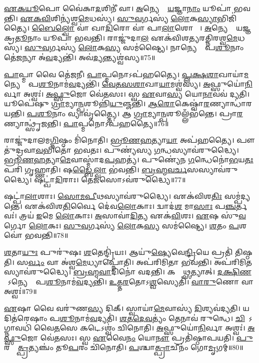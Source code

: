 \ul{𑌏}\ul{𑌕}\ul{𑌯𑍂}𑌪𑍋 𑌵𑍈॑𑌕𑌾\ul{𑌦}𑌶𑌿𑌨𑍀॑ 𑌵𑌾।
\ul{𑌅}𑌨𑍍𑌯𑍇𑌷𑌾𑌂᳚ \ul{𑌯}𑌜𑍍𑌞𑌾\ul{𑌨𑌾𑌂} 𑌯𑍂𑌪𑌾॑ 𑌭𑌵𑌨𑍍𑌤𑌿।
\ul{𑌏}\ul{𑌕}\ul{𑌵𑌿}\ul{}𑌶𑌿𑌨𑍍𑌯॑𑌶𑍍𑌵\ul{𑌮𑍇}𑌧𑌸𑍍𑌯॑।
\ul{𑌸𑍁}\ul{𑌵}𑌰𑍍𑌗𑌸𑍍𑌯॑ \ul{𑌲𑍋}𑌕\ul{𑌸𑍍𑌯𑌾}𑌭𑌿𑌜𑌿॑𑌤𑍍𑌯𑍈।
\ul{𑌬𑍈}\ul{𑌲𑍍}𑌵𑍋 𑌵𑌾॑ 𑌖𑌾\ul{𑌦𑌿}𑌰𑍋 𑌵𑌾॑ 𑌪𑌾\ul{𑌲𑌾}𑌶𑍋 𑌵𑌾᳚।
\ul{𑌅}𑌨𑍍𑌯𑍇𑌷𑌾𑌂᳚ 𑌯𑌜𑍍𑌞𑌕𑍍𑌰\ul{𑌤𑍂}𑌨𑌾𑌂 𑌯𑍂𑌪𑌾॑ 𑌭𑌵𑌨𑍍𑌤𑌿।
𑌰𑌾𑌜𑍍𑌜𑍁॑𑌦𑌾\ul{𑌲} 𑌏𑌕॑𑌵𑌿𑌶𑌤𑍍𑌯𑌰𑌤𑍍𑌨𑌿𑌰𑌶𑍍𑌵\ul{𑌮𑍇}𑌧𑌸𑍍𑌯॑।
\ul{𑌸𑍁}\ul{𑌵}𑌰𑍍𑌗𑌸𑍍𑌯॑ \ul{𑌲𑍋}𑌕\ul{𑌸𑍍𑌯} 𑌸𑌮॑𑌷𑍍𑌟𑍍𑌯𑍈।
𑌨𑌾𑌨𑍍𑌯𑍇𑌷𑌾𑌂᳚ 𑌪\ul{𑌶𑍂}𑌨𑌾𑌂 𑌤𑍇॑\ul{𑌜}𑌨𑍍𑌯𑌾 𑌅॑\ul{𑌵}𑌦𑍍𑌯𑌨𑍍𑌤𑌿॑।
𑌅𑌵॑\ul{𑌦𑍍𑌯}𑌨𑍍𑌤𑍍𑌯𑌶𑍍𑌵॑𑌸𑍍𑌯॥75॥

\ul{𑌪𑌾}𑌪𑍍𑌮𑌾 𑌵𑍈 𑌤𑍇॑\ul{𑌜}𑌨𑍀।
\ul{𑌪𑌾}𑌪𑍍𑌮𑌨𑍋\-𑌽𑌪॑𑌹𑌤𑍍𑌯𑍈।
\ul{𑌪𑍍𑌲}\ul{𑌕𑍍𑌷}\ul{𑌶𑌾}𑌖𑌾𑌯𑌾॑\ul{𑌮}𑌨𑍍𑌯𑍇𑌷𑌾𑌂᳚ 𑌪\ul{𑌶𑍂}𑌨𑌾𑌮॑\ul{𑌵}𑌦𑍍𑌯𑌨𑍍𑌤𑌿॑।
\ul{𑌵𑍇}\ul{𑌤}\ul{𑌸}\ul{𑌶𑌾}𑌖𑌾\ul{𑌯𑌾}𑌮𑌶𑍍𑌵॑𑌸𑍍𑌯।
\ul{𑌅}𑌫𑍍𑌸𑍁𑌯𑍋॑\ul{𑌨𑌿}𑌰𑍍𑌵𑌾 𑌅𑌶𑍍𑌵𑌃॑।
\ul{𑌅}\ul{𑌫𑍍𑌸𑍁}𑌜𑍋 𑌵𑍇॑\ul{𑌤}𑌸𑌃।
𑌸𑍍𑌵 \ul{𑌏}𑌵𑌾\ul{𑌸𑍍𑌯} 𑌯𑍋\ul{𑌨𑌾}𑌵𑌵॑ 𑌦𑍍𑌯𑌤𑌿।
𑌯𑍂𑌪𑍇॑𑌷𑍁 \ul{𑌗𑍍𑌰𑌾}𑌮𑍍𑌯𑌾\ul{𑌨𑍍𑌪}𑌶𑍂𑌨𑍍𑌨𑌿॑\ul{𑌯𑍁}𑌞𑍍𑌜𑌨𑍍𑌤𑌿॑।
\ul{𑌆}\ul{𑌰𑍋}𑌕𑍇𑌷𑍍𑌵𑌾॑\ul{𑌰}𑌣𑍍𑌯𑌾𑌨𑍍𑌧𑌾॑𑌰𑌯𑌨𑍍𑌤𑌿।
\ul{𑌪}\ul{𑌶𑍂}𑌨𑌾𑌂 𑌵𑍍𑌯𑌾𑌵𑍃॑𑌤𑍍𑌤𑍍𑌯𑍈।
𑌆 \ul{𑌗𑍍𑌰𑌾}𑌮𑍍𑌯𑌾\ul{𑌨𑍍𑌪}𑌶𑍂𑌲𑍍𑌲𑌁𑌭॑𑌨𑍍𑌤𑍇।
𑌪𑍍𑌰𑌾\ul{𑌰}𑌣𑍍𑌯𑌾𑌨𑍍𑌥𑍍𑌸𑍃॑𑌜𑌨𑍍𑌤𑌿।
\ul{𑌪𑌾}𑌪𑍍𑌮𑌨𑍋\-𑌽𑌪॑𑌹𑌤𑍍𑌯𑍈॥76॥\anuvakamend[𑌅𑌶𑍍𑌵॑\ul{𑌸𑍍𑌯} 𑌵𑍍𑌯𑌾𑌵𑍃॑\ul{𑌤𑍍𑌤𑍍𑌯𑍈} 𑌤𑍍𑌰𑍀𑌣𑌿॑ 𑌚]

𑌰𑌾𑌜𑍍𑌜𑍁॑𑌦𑌾𑌲𑌮\ul{𑌗𑍍𑌨𑌿}𑌷𑍍𑌠𑌂 𑌮𑌿॑𑌨𑍋𑌤𑌿।
\ul{𑌭𑍍𑌰𑍂}\ul{𑌣}\ul{𑌹}𑌤𑍍𑌯𑌾\ul{𑌯𑌾} 𑌅𑌪॑𑌹𑌤𑍍𑌯𑍈।
𑌪𑍗𑌤𑍁॑𑌦𑍍𑌰𑌵𑌾\ul{𑌵}𑌭𑌿𑌤𑍋॑ 𑌭𑌵𑌤𑌃।
𑌪𑍁𑌣𑍍𑌯॑𑌸𑍍𑌯 \ul{𑌗}𑌨𑍍𑌧𑌸𑍍𑌯𑌾𑌵॑𑌰𑍁𑌦𑍍𑌧𑍍𑌯𑍈।
\ul{𑌭𑍍𑌰𑍂}\ul{𑌣}\ul{𑌹}𑌤𑍍𑌯𑌾\ul{𑌮𑍇}𑌵𑌾𑌸𑍍𑌮𑌾॑𑌦\ul{𑌪}𑌹𑌤𑍍𑌯॑।
𑌪𑍁𑌣𑍍𑌯𑍇॑𑌨 \ul{𑌗}𑌨𑍍𑌧𑍇𑌨𑍋॑\ul{𑌭}𑌯\ul{𑌤𑌃} 𑌪𑌰𑌿॑ 𑌗𑍃𑌹𑍍𑌣𑌾𑌤𑌿।
𑌷\ul{𑌡𑍍𑌬𑍈}\ul{𑌲𑍍}𑌵𑌾 𑌭॑𑌵𑌨𑍍𑌤𑌿।
\ul{𑌬𑍍𑌰}\ul{𑌹𑍍𑌮}\ul{𑌵}\ul{𑌰𑍍𑌚}𑌸𑌸𑍍𑌯𑌾𑌵॑𑌰𑍁𑌦𑍍𑌧𑍍𑌯𑍈।
𑌷𑌟𑍍𑌖𑌾॑\ul{𑌦𑌿}𑌰𑌾𑌃।
𑌤𑍇\ul{𑌜}𑌸𑍋\-𑌽𑌵॑𑌰𑍁𑌦𑍍𑌧𑍍𑌯𑍈॥77॥

𑌷𑌟𑍍𑌪𑌾॑\ul{𑌲𑌾}𑌶𑌾𑌃।
\ul{𑌸𑍋}\ul{𑌮}\ul{𑌪𑍀}𑌥𑌸𑍍𑌯𑌾𑌵॑𑌰𑍁𑌦𑍍𑌧𑍍𑌯𑍈।
𑌏𑌕॑𑌵𑌿𑌶\ul{𑌤𑌿𑌃} 𑌸𑌮𑍍𑌪॑𑌦𑍍𑌯𑌨𑍍𑌤𑍇।
𑌏𑌕॑𑌵𑌿𑌶\ul{𑌤𑌿}𑌰𑍍𑌵𑍈 𑌦𑍇॑𑌵\ul{𑌲𑍋}𑌕𑌾𑌃।
𑌦𑍍𑌵𑌾𑌦॑\ul{𑌶} 𑌮𑌾\ul{𑌸𑌾𑌃} 𑌪\ul{𑌞𑍍𑌚}𑌰𑍍𑌤𑌵𑌃॑।
𑌤𑍍𑌰𑌯॑ \ul{𑌇}𑌮𑍇 \ul{𑌲𑍋}𑌕𑌾𑌃।
\ul{𑌅}𑌸𑌾𑌵𑌾॑\ul{𑌦𑌿}𑌤𑍍𑌯 𑌏𑌕॑\ul{𑌵𑌿}\ul{}𑌶𑌃।
\ul{𑌏}𑌷 𑌸𑍁॑\ul{𑌵}𑌰𑍍𑌗𑍋 \ul{𑌲𑍋}𑌕𑌃।
\ul{𑌸𑍁}\ul{𑌵}𑌰𑍍𑌗𑌸𑍍𑌯॑ \ul{𑌲𑍋}𑌕\ul{𑌸𑍍𑌯} 𑌸𑌮॑𑌷𑍍𑌟𑍍𑌯𑍈।
\ul{𑌶}𑌤𑌂 \ul{𑌪}𑌶𑌵𑍋॑ 𑌭𑌵𑌨𑍍𑌤𑌿॥78॥

\ul{𑌶}𑌤𑌾\ul{𑌯𑍁𑌃} 𑌪𑍁𑌰𑍁॑𑌷𑌃 \ul{𑌶}𑌤𑍇𑌨𑍍𑌦𑍍𑌰𑌿॑𑌯𑌃।
𑌆𑌯𑍁॑\ul{𑌷𑍍𑌯𑍇}𑌵𑍇\ul{𑌨𑍍𑌦𑍍𑌰𑌿}𑌯𑍇 𑌪𑍍𑌰𑌤𑌿॑ 𑌤𑌿𑌷𑍍𑌠𑌤𑌿।
𑌸\ul{𑌰𑍍𑌵𑌂} 𑌵𑌾 𑌅॑𑌶𑍍𑌵\ul{𑌮𑍇}𑌧𑍍𑌯𑌾𑌪𑍍𑌨𑍋॑𑌤𑌿।
𑌅𑌪॑𑌰𑌿𑌮𑌿𑌤𑌾 𑌭𑌵𑌨𑍍𑌤𑌿।
𑌅𑌪॑𑌰𑌿𑌮𑌿\ul{𑌤}𑌸𑍍𑌯𑌾𑌵॑𑌰𑍁𑌦𑍍𑌧𑍍𑌯𑍈।
\ul{𑌬𑍍𑌰}\ul{𑌹𑍍𑌮}\ul{𑌵𑌾}𑌦𑌿𑌨𑍋॑ 𑌵𑌦𑌨𑍍𑌤𑌿।
𑌕𑌸𑍍𑌮𑌾᳚\ul{𑌥𑍍𑌸}𑌤𑍍𑌯𑌾𑌤𑍍।
\ul{𑌦}\ul{𑌕𑍍𑌷𑌿}\ul{𑌣}𑌤𑍋᳚\-𑌽𑌨𑍍𑌯𑍇𑌷𑌾𑌂᳚ 𑌪\ul{𑌶𑍂}𑌨𑌾𑌮॑\ul{𑌵}𑌦𑍍𑌯𑌨𑍍𑌤𑌿॑।
\ul{𑌉}\ul{𑌤𑍍𑌤}\ul{𑌰}𑌤𑍋\-𑌽\ul{𑌶𑍍𑌵}𑌸𑍍𑌯𑍇𑌤𑌿॑।
\ul{𑌵𑌾}\ul{𑌰𑍁}𑌣𑍋 𑌵𑌾 𑌅𑌶𑍍𑌵𑌃॑॥79॥

\ul{𑌏}𑌷𑌾 𑌵𑍈 𑌵𑌰𑍁॑𑌣\ul{𑌸𑍍𑌯} 𑌦𑌿𑌕𑍍।
𑌸𑍍𑌵𑌾𑌯𑌾॑\ul{𑌮𑍇}𑌵𑌾𑌸𑍍𑌯॑ \ul{𑌦𑌿}𑌶𑍍𑌯𑌵॑𑌦𑍍𑌯𑌤𑌿।
𑌯𑌦𑌿𑌤॑𑌰𑍇𑌷𑌾𑌂 𑌪\ul{𑌶𑍂}𑌨𑌾𑌮॑\ul{𑌵}𑌦𑍍𑌯𑌤𑌿॑।
\ul{𑌶}\ul{𑌤}\ul{𑌦𑍇}\ul{𑌵}𑌤𑍍𑌯𑌂॑ 𑌤𑍇𑌨𑌾𑌵॑ 𑌰𑍁𑌨𑍍𑌧𑍇।
\ul{𑌚𑌿}𑌤𑍇᳚\-𑌽𑌗𑍍𑌨𑌾𑌵𑌧𑌿॑ 𑌵𑍈\ul{𑌤}𑌸𑍇 𑌕𑌟𑍇\-𑌽𑌶𑍍𑌵𑌂॑ 𑌚𑌿𑌨𑍋𑌤𑌿।
\ul{𑌅}𑌫𑍍𑌸𑍁𑌯𑍋॑\ul{𑌨𑌿}𑌰𑍍𑌵𑌾 𑌅𑌶𑍍𑌵𑌃॑।
\ul{𑌅}\ul{𑌫𑍍𑌸𑍁}𑌜𑍋 𑌵𑍇॑\ul{𑌤}𑌸𑌃।
𑌸𑍍𑌵 \ul{𑌏}𑌵𑍈\ul{𑌨𑌂} 𑌯𑍋\ul{𑌨𑍗} 𑌪𑍍𑌰𑌤𑌿॑\-𑌷𑍍𑌠𑌾𑌪𑌯𑌤𑌿।
\ul{𑌪𑍁}𑌰𑌸𑍍𑌤𑌾᳚\ul{𑌤𑍍𑌪𑍍𑌰}𑌤𑍍𑌯𑌞𑍍𑌚𑌂॑ 𑌤𑍂\ul{𑌪}𑌰𑌂 𑌚𑌿॑𑌨𑍋𑌤𑌿।
\ul{𑌪}𑌶𑍍𑌚𑌾\ul{𑌤𑍍𑌪𑍍𑌰𑌾}𑌚𑍀𑌨𑌂॑ 𑌗𑍋\ul{𑌮𑍃}𑌗𑌮𑍍॥80॥

